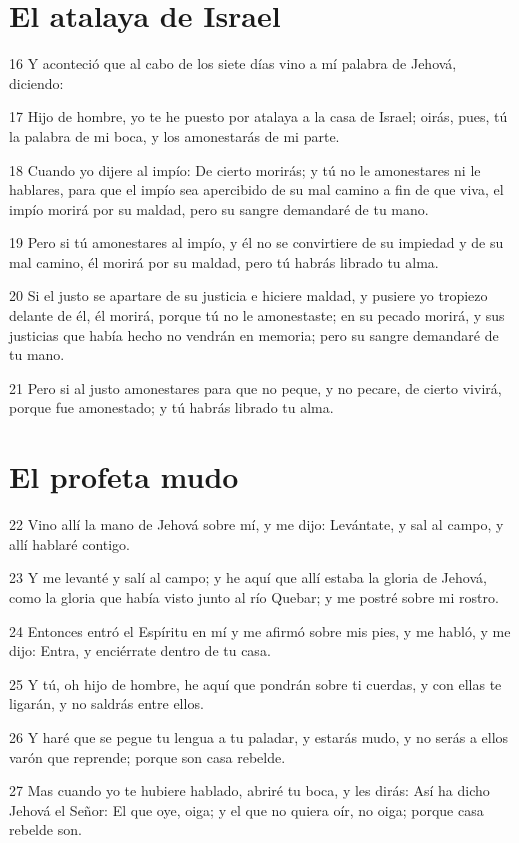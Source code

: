 \section*{El atalaya de Israel}

\par 16 Y aconteció que al cabo de los siete días vino a mí palabra de Jehová, diciendo:
\par 17 Hijo de hombre, yo te he puesto por atalaya a la casa de Israel; oirás, pues, tú la palabra de mi boca, y los amonestarás de mi parte.
\par 18 Cuando yo dijere al impío: De cierto morirás; y tú no le amonestares ni le hablares, para que el impío sea apercibido de su mal camino a fin de que viva, el impío morirá por su maldad, pero su sangre demandaré de tu mano.
\par 19 Pero si tú amonestares al impío, y él no se convirtiere de su impiedad y de su mal camino, él morirá por su maldad, pero tú habrás librado tu alma.
\par 20 Si el justo se apartare de su justicia e hiciere maldad, y pusiere yo tropiezo delante de él, él morirá, porque tú no le amonestaste; en su pecado morirá, y sus justicias que había hecho no vendrán en memoria; pero su sangre demandaré de tu mano.
\par 21 Pero si al justo amonestares para que no peque, y no pecare, de cierto vivirá, porque fue amonestado; y tú habrás librado tu alma.

\section*{El profeta mudo}

\par 22 Vino allí la mano de Jehová sobre mí, y me dijo: Levántate, y sal al campo, y allí hablaré contigo.
\par 23 Y me levanté y salí al campo; y he aquí que allí estaba la gloria de Jehová, como la gloria que había visto junto al río Quebar; y me postré sobre mi rostro.
\par 24 Entonces entró el Espíritu en mí y me afirmó sobre mis pies, y me habló, y me dijo: Entra, y enciérrate dentro de tu casa.
\par 25 Y tú, oh hijo de hombre, he aquí que pondrán sobre ti cuerdas, y con ellas te ligarán, y no saldrás entre ellos.
\par 26 Y haré que se pegue tu lengua a tu paladar, y estarás mudo, y no serás a ellos varón que reprende; porque son casa rebelde.
\par 27 Mas cuando yo te hubiere hablado, abriré tu boca, y les dirás: Así ha dicho Jehová el Señor: El que oye, oiga; y el que no quiera oír, no oiga; porque casa rebelde son.

